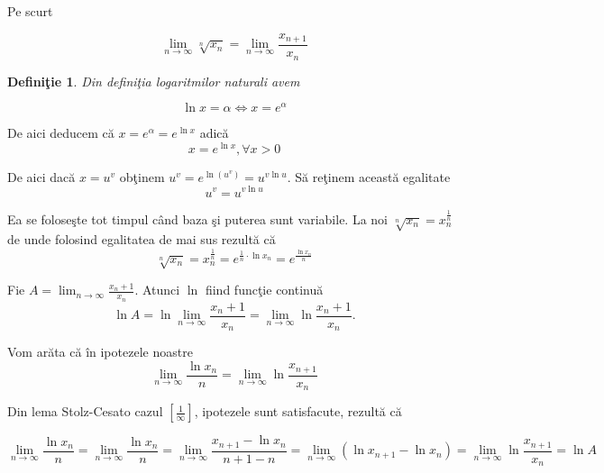 \documentclass[a4paper,12pt,oneside]{report}
\newtheorem{definition}{Defini\c tie}
\begin{document}
Pe scurt 

\begin{displaymath}
  \lim_{n \to \infty } \sqrt[n]{x_{n}} = \lim_{n \to \infty }\frac{x_{n+1}}{x_{n}}
\end{displaymath}


\begin{definition}
  Din defini\c tia logaritmilor naturali avem 
\end{definition}

\begin{displaymath}
  \ln x = \alpha  \Leftrightarrow x = e^{\alpha }
\end{displaymath}

De aici deducem c\u a \(x = e^{\alpha } = e^{\ln x}\) adic\u a 
\begin{displaymath}
  x = e^{\ln x}, \forall x> 0
\end{displaymath}

De aici dac\u a \(x=u^{v}\) ob\c tinem \(u^{v} = e^{\ln\left ( u^{v} \right )} = u^{v\ln u}\). 
S\u a re\c tinem aceast\u a egalitate
\begin{displaymath}
  u^{v} = u^{v\ln u}
\end{displaymath}

Ea se folose\c ste tot timpul c\^ and baza \c si puterea sunt variabile. La noi  \(\sqrt[n]{x_{n}}= x_{n}^{\frac{1}{n}} \)de unde folosind egalitatea de mai sus rezult\u a c\u a 
\begin{displaymath}
  \sqrt[n]{x_{n}}= x_{n}^{\frac{1}{n}} = e^{\frac{1}{n}\cdot \ln x_{n}} = e^{\frac{\ln x_{n}}{n}}
\end{displaymath}


Fie \(A = \lim_{n \to \infty }\frac{x_{n}+1}{x_{n}}\). Atunci \(\ln\) fiind func\c tie continu\u a 
\begin{displaymath}
  \ln A = \ln \lim_{n \to \infty }\frac{x_{n}+1}{x_{n}} = \lim_{n \to \infty }\ln \frac{x_{n}+1}{x_{n}}.
\end{displaymath}


Vom ar\u ata c\u a \^ in ipotezele noastre 
\begin{displaymath}
  \lim_{n \to \infty }\frac{\ln x_{n}}{n} = \lim_{n \to \infty }\ln\frac{x_{n+1}}{x_{n}}
\end{displaymath}

 Din lema Stolz-Cesato cazul \(\left [ \frac{1}{\infty } \right ]\), ipotezele sunt satisfacute, rezult\u a c\u a 

\begin{displaymath}
  \lim_{n \to \infty }\frac{\ln x_{n}}{n} 
= \lim_{n \to \infty }\frac{\ln x_{n}}{n}  
= \lim_{n \to \infty}\frac{x_{n+1}-\ln x_{n}}{n+1-n} 
= \lim_{n \to \infty}\left ( \ln x_{n+1} - \ln x_{n} \right ) 
= \lim_{n \to \infty }\ln \frac{x_{n+1}}{x_{n}} 
= \ln A
\end{displaymath}
\end{document}

